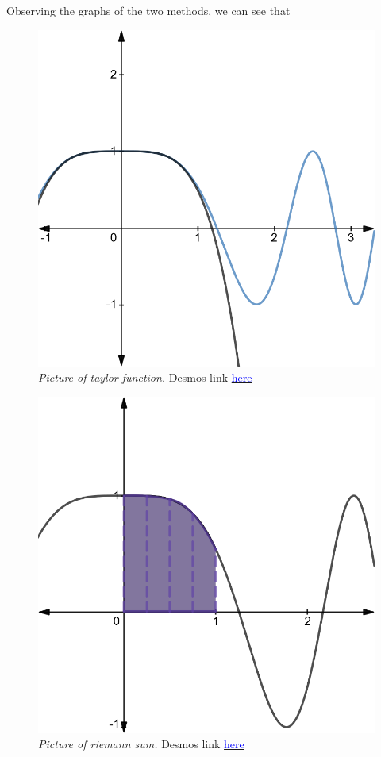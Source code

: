 \documentclass[12pt]{article}
\begin{document}
Observing the graphs of the two methods, we can see that
\begin{figure}[H]
  \begin{center}
    \includegraphics[scale=.3]{taylor.png}
    \caption{\textit{Picture of taylor function.} Desmos link \href{https://www.desmos.com/calculator/r4zur75mvp}{\textcolor{blue}{here}}}
  \end{center}
\end{figure}

\begin{figure}[h]
  \begin{center}
    \includegraphics[scale=.3]{riemann.png}
    \caption{\textit{Picture of riemann sum.} Desmos link \href{https://www.desmos.com/calculator/zrvlosytaf}{\textcolor{blue}{here}}}
  \end{center}
\end{figure}
\end{document}
